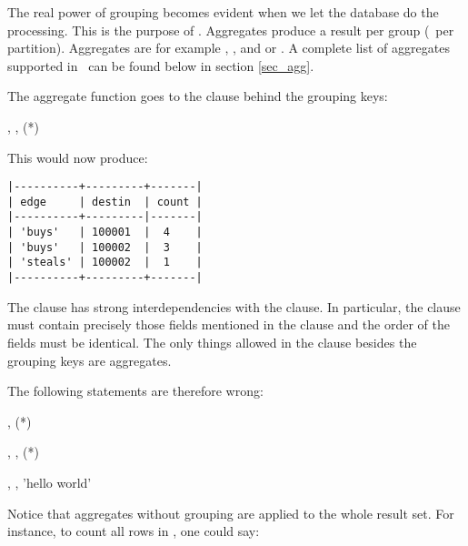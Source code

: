 The real power of grouping becomes evident
when we let the database do the processing.
This is the purpose of .
Aggregates produce a result per group (\ie\ per partition).
Aggregates are for example
, ,
 and  or .
A complete list of aggregates supported in \nowdb\
can be found below in section \ref{sec_agg}.

The aggregate function goes to the  clause
behind the grouping keys:

 ,
                 ,
                 (*)
 
 

This would now produce:

\begin{minipage}{\textwidth}
\begin{verbatim}
|----------+---------+-------|
| edge     | destin  | count |
|----------+---------|-------|
| 'buys'   | 100001  |  4    |
| 'buys'   | 100002  |  3    |
| 'steals' | 100002  |  1    |
|----------+---------+-------|
\end{verbatim}
\end{minipage}

The  clause has strong interdependencies
with the  clause.
In particular, the  clause must
contain precisely those fields mentioned in the
 clause and the order of the fields
must be identical. The only things allowed in
the  clause besides the grouping keys
are aggregates.

The following statements are therefore wrong:

 , 
                 (*)
 
 

 ,
                 , 
                 (*)
 
 

 , 
                 ,
                 'hello world'
 
 

Notice that aggregates without grouping
are applied to the whole result set.
For instance, to count all rows in ,
one could say:

